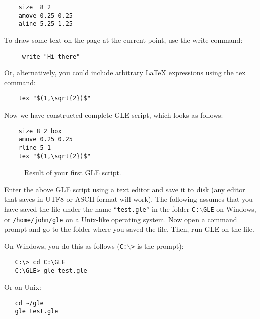 \preglecode{}
\begin{Verbatim}
    size  8 2
    amove 0.25 0.25
    aline 5.25 1.25
\end{Verbatim}
\postglecode{}

To draw some text on the page at the current point, use the {\sf write} command:

\preglecode{}
\begin{Verbatim}
     write "Hi there"
\end{Verbatim}
\postglecode{}

Or, alternatively, you could include arbitrary \LaTeX{} expressions using the {\sf tex} command:

\preglecode{}
\begin{Verbatim}
    tex "$(1,\sqrt{2})$"
\end{Verbatim}
\postglecode{}

Now we have constructed complete GLE script, which looks as follows:

\preglecode{}
\begin{Verbatim}
    size 8 2 box
    amove 0.25 0.25
    rline 5 1
    tex "$(1,\sqrt{2})$"
\end{Verbatim}
\postglecode{}

\begin{figure}
\centering

\caption{\label{firstgle:fig}Result of your first GLE script.}
\end{figure}

Enter the above GLE script using a text editor and save it to disk (any editor that saves in UTF8 or ASCII format will work). The following assumes that you have saved the file under the name ``\texttt{test.gle}'' in the folder \texttt{C:$\backslash$GLE} on Windows, or \texttt{/home/john/gle} on a Unix-like operating system. Now open a command prompt and go to the folder where you saved the file. Then, run GLE on the file.

On Windows, you do this as follows (\texttt{C:$\backslash$>} is the prompt):

\preglecode{}
\begin{Verbatim}
   C:\> cd C:\GLE
   C:\GLE> gle test.gle
\end{Verbatim}
\postglecode{}

Or on Unix:

\preglecode{}
\begin{Verbatim}
   cd ~/gle
   gle test.gle
\end{Verbatim}
\postglecode{}

